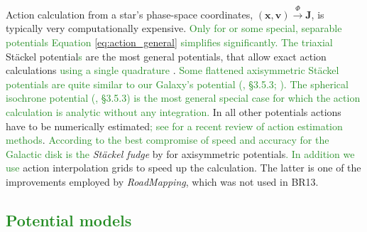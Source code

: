 \documentclass[iop,revtex4]{emulateapj}
\newcommand{\vect}[1]{\boldsymbol{#1}}
\newcommand{\RM}{{\sl RoadMapping}}
\newcommand{\NEW}[1]{\textcolor{ForestGreen}{#1}}
\newcommand{\OLD}[1]{}
\begin{document}
\OLD{Orbits in an axisymmetric gravitational potential $\Phi$ are best described and fully specified by the three actions $\vect{J} \equiv (J_R, J_z, J_\phi\equiv L_z)$ (Binney \& Tremaine 2008, \S 3.5).} 

Action calculation from a star's phase-space coordinates, $(\vect{x},\vect{v}) \stackrel{\Phi}{\longrightarrow} \vect{J}$, is typically very computationally expensive. \NEW{Only for or some special, separable potentials Equation \eqref{eq:action_general} simplifies significantly.} \OLD{The spherical isochrone potential 1959AnAp...22..126H and axisymmetric}\NEW{The triaxial} St\"{a}ckel potential\NEW{s} \citep{1985MNRAS.216..273D} are the most general  \OLD{(Galactic)} potentials, that allow exact action calculations \NEW{using a single quadrature} \OLD{(2008gady.book.....B, \S 3.5.2 and \S 3.5.3)}. \NEW{Some flattened axisymmetric St\"{a}ckel potentials are quite similar to our Galaxy's potential (\citealt{2008gady.book.....B}, \S 3.5.3; \citealt{1994AA...287...43B,2003MNRAS.340..752F}). The spherical isochrone potential (\citealt{1959AnAp...22..126H,2008gady.book.....B}, \S 3.5.3) is the most general special case for which the action calculation is analytic without any integration.} In all other potentials actions have to be numerically estimated\NEW{; see \citet{2016MNRAS.457.2107S} for a recent review of action estimation methods}. \NEW{According to \citet{2016MNRAS.457.2107S} the best compromise of speed and accuracy for the Galactic disk is the} \OLD{We use the} \emph{St\"{a}ckel fudge} by \citet{2012MNRAS.426.1324B} for axisymmetric potentials\NEW{. In addition we use} \OLD{and} action interpolation grids \citep{2012MNRAS.426.1324B,2015ApJS..216...29B} to speed up the calculation. The latter is one of the improvements employed by \RM{}, which was not used in BR13. 

\subsection{\NEW{Potential models}} %
\end{document}
